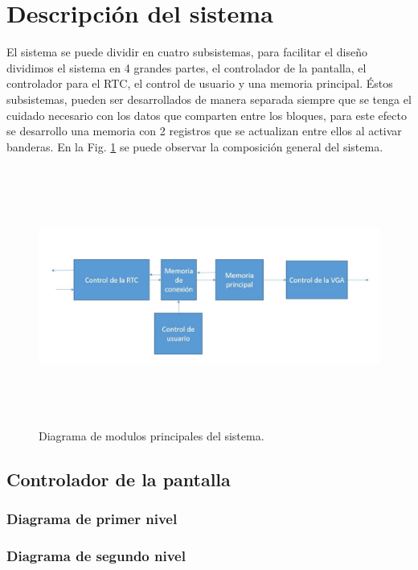 \documentclass[12pt,a4paper]{article}
\begin{document}
\section{Descripción del sistema}
El sistema se puede dividir en cuatro subsistemas, para facilitar el diseño dividimos el sistema en 4 grandes partes, el controlador de la pantalla, el controlador para el RTC, el control de usuario y  una memoria principal. Éstos subsistemas, pueden ser desarrollados de manera separada siempre que se tenga el cuidado necesario con los datos que comparten entre los bloques, para este efecto se desarrollo una memoria con 2 registros que se actualizan entre ellos al activar banderas. En la Fig. \ref{fig:sistema} se puede observar la composición general del sistema.

\begin{figure}[hbtp]
	\centering
	\includegraphics[height=8.5cm, width=18cm]{img/Subsistemas.jpg}
	\caption{Diagrama de modulos principales del sistema.}
	\label{fig:sistema}
\end{figure}

\subsection{Controlador de la pantalla}
\subsubsection{Diagrama de primer nivel}  \label{sec:VGA_pn}


\subsubsection{Diagrama de segundo nivel} \label{sec:VGA_sn}
\end{document}
